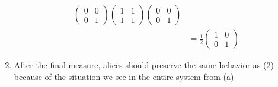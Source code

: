 \documentclass{article}%
\begin{document}
\begin{enumerate}
\begin{align*}
              \begin{pmatrix}
                  0 & 0 \\
                  0 & 1
              \end{pmatrix}
              \begin{pmatrix}
                  1 & 1 \\
                  1 & 1
              \end{pmatrix}
              \begin{pmatrix}
                  0 & 0 \\
                  0 & 1
              \end{pmatrix}                  \\
               & = \frac{1}{2} \begin{pmatrix}
                                   1 & 0 \\
                                   0 & 1
                               \end{pmatrix}
          \end{align*}
    \item After the final measure, alices should preserve the same behavior as (2) because of the situation we see in the entire system from (a)

\end{enumerate}
\end{document}
